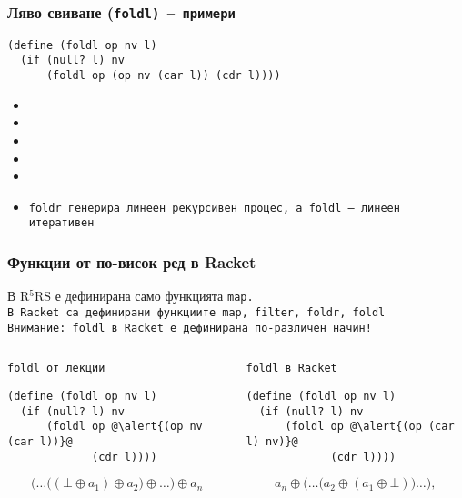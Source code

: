 \documentclass{beamer}
\begin{document}
\begin{frame}[fragile,label=foldlex]
  \frametitle{Ляво свиване (\tt{foldl}) --- примери}

\begin{lstlisting}
(define (foldl op nv l)
  (if (null? l) nv
      (foldl op (op nv (car l)) (cdr l))))
\end{lstlisting}
  \pause
  \small
  \begin{itemize}[<+->]
  \item {}
  \item {}
  \item {}
  \item {}
  \item {}
  \item \tt{foldr} генерира линеен рекурсивен процес, а \tt{foldl} --- линеен итеративен
  \end{itemize}
\end{frame}

\begin{frame}[fragile]
  \frametitle{Функции от по-висок ред в Racket}

  В R$^5$RS е дефинирана само функцията \tt{map}.\\
  В Racket са дефинирани функциите \tt{map}, \tt{filter}, \tt{foldr}, \tt{foldl}\\[1em]
  \pause
  \alert{Внимание: \tt{foldl} в Racket е дефинирана по-различен начин!}\\[1em]
  \begin{columns}[T,onlytextwidth]
    \small
    \begin{column}{.5\textwidth}
      \tt{foldl} от лекции\\[1em]
\begin{lstlisting}
(define (foldl op nv l)
  (if (null? l) nv
      (foldl op @\alert{(op nv (car l))}@
             (cdr l))))
\end{lstlisting}
      \begin{equation*}
        \Big(\ldots\big((\bot \oplus a_1) \oplus a_2\big) \oplus \ldots\Big) \oplus a_n
      \end{equation*}
    \end{column}
    \begin{column}{.5\textwidth}
      \tt{foldl} в Racket\\[1em]
\begin{lstlisting}
(define (foldl op nv l)
  (if (null? l) nv
      (foldl op @\alert{(op (car l) nv)}@
             (cdr l))))
\end{lstlisting}
      \begin{equation*}
        a_n \oplus \Big(\ldots \big(a_2 \oplus (a_1 \oplus \bot)\big)\ldots\Big),
      \end{equation*}
    \end{column}
  \end{columns}
\end{frame}
\end{document}
